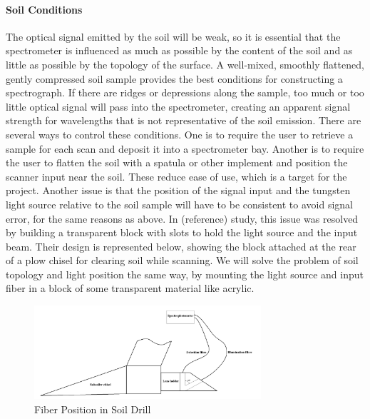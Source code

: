 \paragraph{Soil Conditions} The optical signal emitted by the soil will be weak, so it is essential that the spectrometer is influenced as much as possible by the content of the soil and as little as possible by the topology of the surface. A well-mixed, smoothly flattened, gently compressed soil sample provides the best conditions for constructing a spectrograph. If there are ridges or depressions along the sample, too much or too little optical signal will pass into the spectrometer, creating an apparent signal strength for wavelengths that is not representative of the soil emission. There are several ways to control these conditions. One is to require the user to retrieve a sample for each scan and deposit it into a spectrometer bay. Another is to require the user to flatten the soil with a spatula or other implement and position the scanner input near the soil. These reduce ease of use, which is a target for the project. Another issue is that the position of the signal input and the tungsten light source relative to the soil sample will have to be consistent to avoid signal error, for the same reasons as above. In (reference) study, this issue was resolved by building a transparent block with slots to hold the light source and the input beam. Their design is represented below, showing the block attached at the rear of a plow chisel for clearing soil while scanning. We will solve the problem of soil topology and light position the same way, by mounting the light source and input fiber in a block of some transparent material like acrylic.

\begin{figure}[H]
    \caption{Fiber Position in Soil Drill}
    \centering
    \includegraphics[width=0.75\textwidth]{images/Acrylic Block Fiber positioner.png}
\end{figure}


